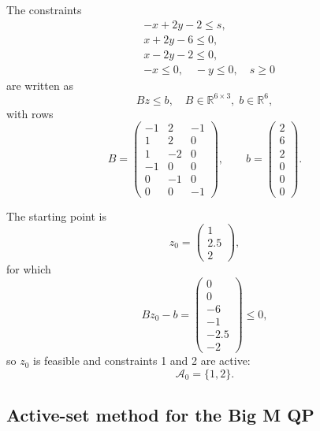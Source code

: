 \documentclass[11pt]{article}
\begin{document}
The constraints
\[
\begin{aligned}
&-x + 2y - 2 \le s,\\
&x + 2y - 6 \le 0,\\
&x - 2y - 2 \le 0,\\
&-x \le 0,\quad -y \le 0,\quad s \ge 0
\end{aligned}
\]
are written as
\[
Bz \le b,\quad B\in\mathbb{R}^{6\times 3},\; b\in\mathbb{R}^6,
\]
with rows
\[
B =
\begin{pmatrix}
-1 & 2  & -1\\
 1 & 2  &  0\\
 1 & -2 &  0\\
-1 & 0  &  0\\
 0 & -1 &  0\\
 0 & 0  & -1
\end{pmatrix},\qquad
b = \begin{pmatrix}2\\6\\2\\0\\0\\0\end{pmatrix}.
\]

The starting point is
\[
z_0 = \begin{pmatrix}1\\[0.1em]2.5\\[0.1em]2\end{pmatrix},
\]
for which
\[
Bz_0 - b = \begin{pmatrix}
0\\[0.1em]0\\[0.1em]-6\\[0.1em]-1\\[0.1em]-2.5\\[0.1em]-2
\end{pmatrix}\le 0,
\]
so \(z_0\) is feasible and constraints 1 and 2 are active:
\[
\mathcal{A}_0 = \{1,2\}.
\]

\subsection*{Active-set method for the Big M QP}
\end{document}
